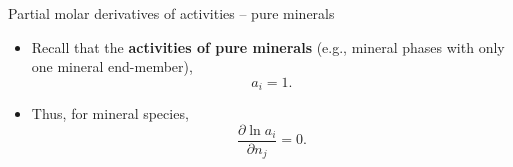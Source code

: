 %
\begin{frame}{Partial molar derivatives of activities -- pure minerals}
\begin{itemize}
\item Recall that the {\bf activities of pure minerals} 
(e.g., mineral phases with only one mineral end-member),
\[
a_{i}=1.
\]
\item Thus, for mineral species, 
\[
\frac{\partial\ln a_{i}}{\partial n_{j}}=0.
\]
\end{itemize}
\end{frame}
%
%
